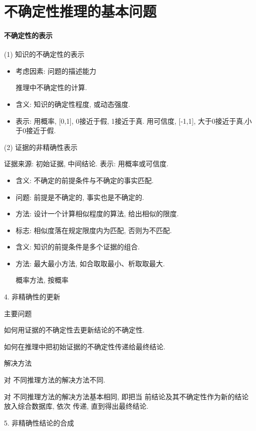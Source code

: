 \section{不确定性推理的基本问题 }\label{AI32C6Sec6.2}
\paragraph{不确定性的表示}

(1) 知识的不确定性的表示
\begin{itemize}
\item 考虑因素: 问题的描述能力

      推理中不确定性的计算.

\item 含义: 知识的确定性程度, 或动态强度.
\item 表示: 用概率, [0,1], 0接近于假, 1接近于真. 用可信度, [-1,1], 大于0接近于真,小于0接近于假.
\end{itemize}

(2) 证据的非精确性表示

    证据来源: 初始证据, 中间结论.
    表示: 用概率或可信度.
\begin{itemize}
\item 含义: 不确定的前提条件与不确定的事实匹配.
\item 问题: 前提是不确定的, 事实也是不确定的.
\item 方法: 设计一个计算相似程度的算法, 给出相似的限度.
\item 标志: 相似度落在规定限度内为匹配, 否则为不匹配.
\item 含义: 知识的前提条件是多个证据的组合.
\item 方法: 最大最小方法, 如合取取最小、析取取最大.

    概率方法, 按概率
\end{itemize}

4. 非精确性的更新

    主要问题

     如何用证据的不确定性去更新结论的不确定性.

     如何在推理中把初始证据的不确定性传递给最终结论.

    解决方法

    对 不同推理方法的解决方法不同.

    对 不同推理方法的解决方法基本相同, 即把当 前结论及其不确定性作为新的结论放入综合数据库, 依次 传递, 直到得出最终结论.

5. 非精确性结论的合成

